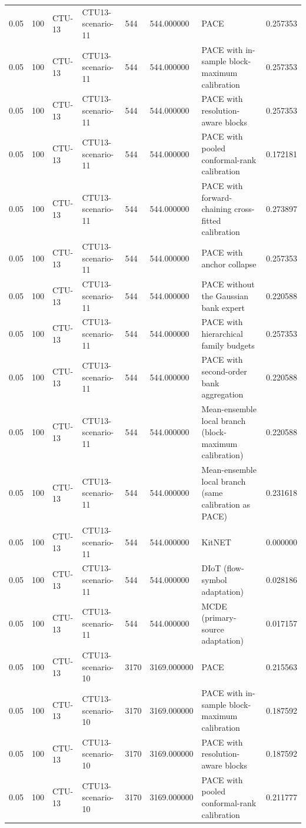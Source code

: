 \begin{tabular}{llllllll}
0.05 & 100 & CTU-13 & CTU13-scenario-11 & 544 & 544.000000 & PACE & 0.257353 \\
0.05 & 100 & CTU-13 & CTU13-scenario-11 & 544 & 544.000000 & PACE with in-sample block-maximum calibration & 0.257353 \\
0.05 & 100 & CTU-13 & CTU13-scenario-11 & 544 & 544.000000 & PACE with resolution-aware blocks & 0.257353 \\
0.05 & 100 & CTU-13 & CTU13-scenario-11 & 544 & 544.000000 & PACE with pooled conformal-rank calibration & 0.172181 \\
0.05 & 100 & CTU-13 & CTU13-scenario-11 & 544 & 544.000000 & PACE with forward-chaining cross-fitted calibration & 0.273897 \\
0.05 & 100 & CTU-13 & CTU13-scenario-11 & 544 & 544.000000 & PACE with anchor collapse & 0.257353 \\
0.05 & 100 & CTU-13 & CTU13-scenario-11 & 544 & 544.000000 & PACE without the Gaussian bank expert & 0.220588 \\
0.05 & 100 & CTU-13 & CTU13-scenario-11 & 544 & 544.000000 & PACE with hierarchical family budgets & 0.257353 \\
0.05 & 100 & CTU-13 & CTU13-scenario-11 & 544 & 544.000000 & PACE with second-order bank aggregation & 0.220588 \\
0.05 & 100 & CTU-13 & CTU13-scenario-11 & 544 & 544.000000 & Mean-ensemble local branch (block-maximum calibration) & 0.220588 \\
0.05 & 100 & CTU-13 & CTU13-scenario-11 & 544 & 544.000000 & Mean-ensemble local branch (same calibration as PACE) & 0.231618 \\
0.05 & 100 & CTU-13 & CTU13-scenario-11 & 544 & 544.000000 & KitNET & 0.000000 \\
0.05 & 100 & CTU-13 & CTU13-scenario-11 & 544 & 544.000000 & DIoT (flow-symbol adaptation) & 0.028186 \\
0.05 & 100 & CTU-13 & CTU13-scenario-11 & 544 & 544.000000 & MCDE (primary-source adaptation) & 0.017157 \\
0.05 & 100 & CTU-13 & CTU13-scenario-10 & 3170 & 3169.000000 & PACE & 0.215563 \\
0.05 & 100 & CTU-13 & CTU13-scenario-10 & 3170 & 3169.000000 & PACE with in-sample block-maximum calibration & 0.187592 \\
0.05 & 100 & CTU-13 & CTU13-scenario-10 & 3170 & 3169.000000 & PACE with resolution-aware blocks & 0.187592 \\
0.05 & 100 & CTU-13 & CTU13-scenario-10 & 3170 & 3169.000000 & PACE with pooled conformal-rank calibration & 0.211777 \\

\end{tabular}
